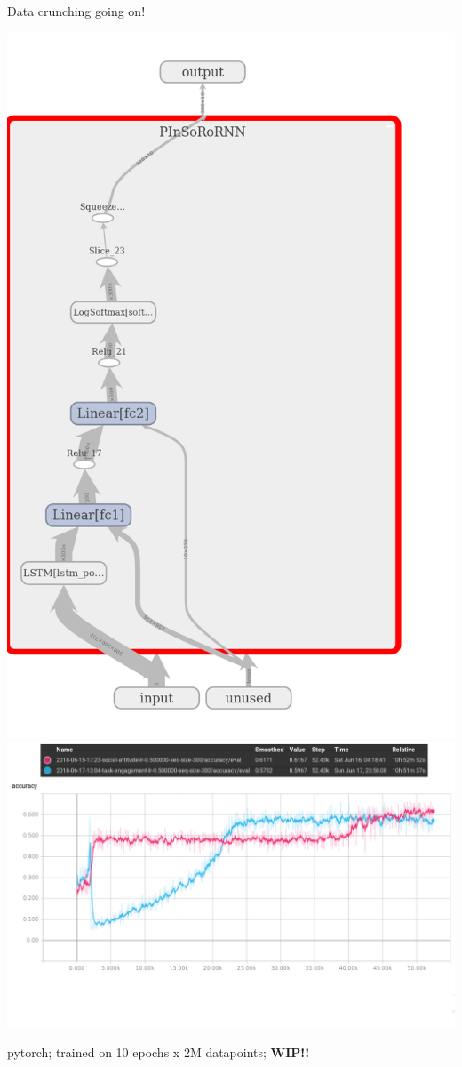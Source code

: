 \documentclass[compress]{beamer}
\begin{document}
\begin{frame}{Data crunching going on!}
    \begin{center}
        \includegraphics[width=0.35\linewidth]{pinsoronet/pinsoro-net-v2}
        \includegraphics[width=0.6\linewidth]{pinsoronet/pinsoronet-v2-accuracy-social-attitude-task-engagement}
    \end{center}

    pytorch; trained on 10 epochs x 2M datapoints; {\bf WIP!!}
\end{frame}


\end{document}
